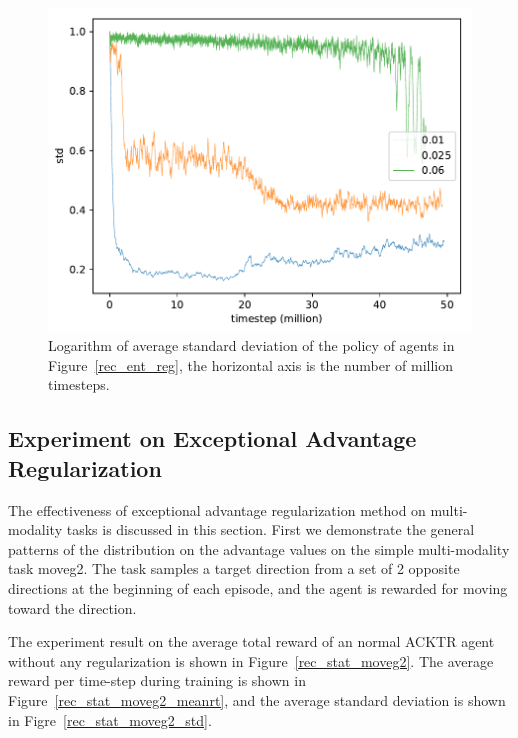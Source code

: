 \begin{figure}[!htbp]
	\includegraphics[width=\textwidth]{images/rec_180609_std_ent_reg.pdf}
	\centering
	\caption{Logarithm of average standard deviation of the policy of agents in Figure~\ref{rec_ent_reg}, the horizontal axis is the number of million timesteps.}\label{rec_std_ent_reg}
\end{figure}

\subsection{Experiment on Exceptional Advantage Regularization}
The effectiveness of exceptional advantage regularization method on multi-modality tasks is discussed in this section.
First we demonstrate the general patterns of the distribution on the advantage values on the simple multi-modality task moveg2. The task samples a target direction from a set of 2 opposite directions at the beginning of each episode, and the agent is rewarded for moving toward the direction.

The experiment result on the average total reward of an normal ACKTR agent without any regularization is shown in Figure~\ref{rec_stat_moveg2}. The average reward per time-step during training is shown in Figure~\ref{rec_stat_moveg2_meanrt}, and the average standard deviation is shown in Figre~\ref{rec_stat_moveg2_std}.


